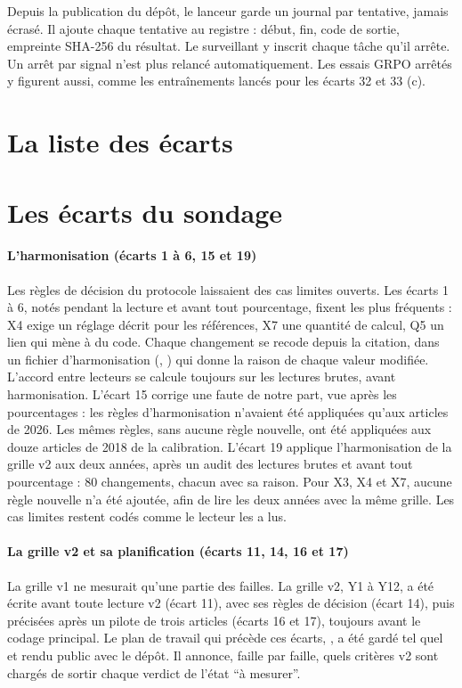 Depuis la publication du dépôt, le lanceur  garde un journal par tentative, jamais écrasé. Il
ajoute chaque tentative au registre  : début, fin, code de sortie,
empreinte SHA-256 du résultat. Le surveillant y inscrit chaque tâche qu'il arrête. Un arrêt par
signal n'est plus relancé automatiquement. Les essais GRPO arrêtés y figurent aussi, comme les
entraînements lancés pour les écarts 32 et 33 (c).

\section{La liste des écarts}
\label{sec:liste-ecarts}


\section{Les écarts du sondage}
\label{sec:ecarts-sondage}

\paragraph{L'harmonisation (écarts 1 à 6, 15 et 19)} Les règles de décision du protocole laissaient
des cas limites ouverts. Les écarts 1 à 6, notés pendant la lecture et avant tout pourcentage,
fixent les plus fréquents : X4 exige un réglage décrit pour les références, X7 une quantité de
calcul, Q5 un lien qui mène à du code. Chaque changement se recode depuis la citation, dans un
fichier d'harmonisation (, ) qui donne la raison de
chaque valeur modifiée. L'accord entre lecteurs se calcule toujours sur les lectures brutes, avant
harmonisation. L'écart 15 corrige une faute de notre part, vue après les pourcentages : les règles
d'harmonisation n'avaient été appliquées qu'aux articles de 2026. Les mêmes règles, sans aucune
règle nouvelle, ont été appliquées aux douze articles de 2018 de la calibration. L'écart 19 applique
l'harmonisation de la grille v2 aux deux années, après un audit des lectures brutes et avant tout
pourcentage : 80 changements, chacun avec sa raison. Pour X3, X4 et X7, aucune règle nouvelle n'a
été ajoutée, afin de lire les deux années avec la même grille. Les cas limites restent codés comme
le lecteur les a lus.

\paragraph{La grille v2 et sa planification (écarts 11, 14, 16 et 17)} La grille v1 ne mesurait
qu'une partie des failles. La grille v2, Y1 à Y12, a été écrite avant toute
lecture v2 (écart 11), avec ses règles de décision (écart 14), puis précisées après un
pilote de trois articles (écarts 16 et 17), toujours avant le codage principal. Le plan de travail
qui précède ces écarts, , a été gardé tel quel et rendu public avec
le dépôt. Il annonce, faille par faille, quels critères v2 sont chargés de sortir chaque
verdict de l'état \enquote{à mesurer}.

